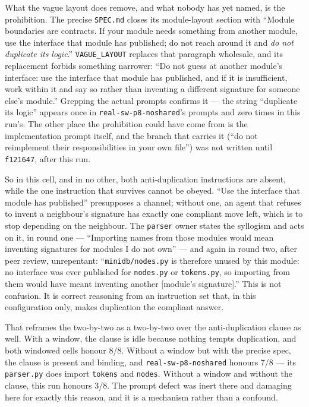 \documentclass[11pt]{article}
\begin{document}
What the vague layout does remove, and what nobody has yet named, is the prohibition. The precise
\texttt{SPEC.md} closes its module-layout section with ``Module boundaries are contracts. If your
module needs something from another module, use the interface that module has published; do not
reach around it and \emph{do not duplicate its logic}.'' \texttt{VAGUE\_LAYOUT} replaces that
paragraph wholesale, and its replacement forbids something narrower: ``Do not guess at another
module's interface: use the interface that module has published, and if it is insufficient, work
within it and say so rather than inventing a different signature for someone else's module.''
Grepping the actual prompts confirms it --- the string ``duplicate its logic'' appears once in
\texttt{real-sw-p8-noshared}'s prompts and zero times in this run's. The other place the
prohibition could have come from is the implementation prompt itself, and the branch that carries
it (``do not reimplement their responsibilities in your own file'') was not written until
\texttt{f121647}, after this run.

So in this cell, and in no other, both anti-duplication instructions are absent, while the one
instruction that survives cannot be obeyed. ``Use the interface that module has published''
presupposes a channel; without one, an agent that refuses to invent a neighbour's signature has
exactly one compliant move left, which is to stop depending on the neighbour. The
\texttt{parser} owner states the syllogism and acts on it, in round one --- ``Importing names
from those modules would mean inventing signatures for modules I do not own'' --- and again in
round two, after peer review, unrepentant: ``\texttt{minidb/nodes.py} is therefore unused by this
module: no interface was ever published for \texttt{nodes.py} or \texttt{tokens.py}, so importing
from them would have meant inventing another [module's signature].'' This is not confusion. It is
correct reasoning from an instruction set that, in this configuration only, makes duplication the
compliant answer.

That reframes the two-by-two as a two-by-two over the anti-duplication clause as well. With a
window, the clause is idle because nothing tempts duplication, and both windowed cells honour
8/8. Without a window but with the precise spec, the clause is present and binding, and
\texttt{real-sw-p8-noshared} honours 7/8 --- its \texttt{parser.py} does import \texttt{tokens}
and \texttt{nodes}. Without a window and without the clause, this run honours 3/8. The prompt
defect was inert there and damaging here for exactly this reason, and it is a mechanism rather
than a confound.
\end{document}
